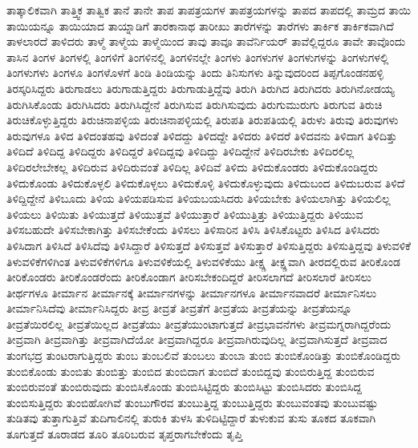 {ತಾತ್ಕಾಲಿಕವಾಗಿ
ತಾತ್ತ್ವಿಕ
ತಾತ್ವಿಕ
ತಾನೆ
ತಾನೇ
ತಾಪ
ತಾಪತ್ರಯಗಳ
ತಾಪತ್ರಯಗಳನ್ನು
ತಾಪದ
ತಾಪದಲ್ಲಿ
ತಾಮ್ರದ
ತಾಯಿ
ತಾಯಿಯನ್ನೂ
ತಾಯಿಯಾದ
ತಾಯ್ನಾಡಿಗೆ
ತಾರಕಾನಾಥ
ತಾರೀಖು
ತಾರೆಗಳನ್ನು
ತಾರೆಗಳು
ತಾರ್ಕಿಕ
ತಾರ್ಕಿಕವಾಗಿದೆ
ತಾಳಲಾರದೆ
ತಾಳಿದರು
ತಾಳ್ಮೆ
ತಾಳ್ಮೆಯ
ತಾಳ್ಮೆಯಿಂದ
ತಾವು
ತಾವೂ
ತಾವೆರ್ನಿಯರ್
ತಾವೆಲ್ಲಿದ್ದರೂ
ತಾವೇ
ತಾವೊಂದು
ತಾಸಿನ
ತಿಂಗಳ
ತಿಂಗಳಲ್ಲಿ
ತಿಂಗಳಿಗೆ
ತಿಂಗಳಿನಲ್ಲಿ
ತಿಂಗಳಿನಲ್ಲೇ
ತಿಂಗಳು
ತಿಂಗಳುಗಳ
ತಿಂಗಳುಗಳನ್ನು
ತಿಂಗಳುಗಳಲ್ಲಿ
ತಿಂಗಳುಗಳು
ತಿಂಗಳೂ
ತಿಂಗಳೊಳಗೆ
ತಿಂಡಿ
ತಿಂಡಿಯನ್ನು
ತಿಂದು
ತಿನಿಸುಗಳು
ತಿನ್ನುವುದರಿಂದ
ತಿಪ್ಪಗೊಂಡನಹಳ್ಳಿ
ತಿರಸ್ಕರಿಸಿದ್ದರು
ತಿರುಗಾಡಲು
ತಿರುಗಾಡುತ್ತಿದ್ದರು
ತಿರುಗಾಡುತ್ತಿದ್ದೆವು
ತಿರುಗಿ
ತಿರುಗಿದ
ತಿರುಗಿದರು
ತಿರುಗಿನೋಡಯ್ಯ
ತಿರುಗಿಸಿಕೊಂಡು
ತಿರುಗಿಸಿದರು
ತಿರುಗಿಸಿದ್ದೇನೆ
ತಿರುಗಿಸುವ
ತಿರುಗಿಸುವುದು
ತಿರುಗುಮುರುಗು
ತಿರುಗುವ
ತಿರುಚಿ
ತಿರುಚಿಕೊಳ್ಳುತ್ತಿದ್ದರು
ತಿರುಚಿನಾಪಳ್ಳಿಯ
ತಿರುಚಿನಾಪಳ್ಳಿಯಲ್ಲಿ
ತಿರುಪತಿ
ತಿರುಪತಿಯಲ್ಲಿ
ತಿರುಳು
ತಿರುವು
ತಿರುವುಗಳು
ತಿರುವುಗಳೂ
ತಿಳಿದ
ತಿಳಿದಂತಹವು
ತಿಳಿದಂತೆ
ತಿಳಿದದ್ದು
ತಿಳಿದದ್ದೇ
ತಿಳಿದರು
ತಿಳಿದರೆ
ತಿಳಿದವನು
ತಿಳಿದಾಗ
ತಿಳಿದಿತ್ತು
ತಿಳಿದಿದೆ
ತಿಳಿದಿದ್ದ
ತಿಳಿದಿದ್ದರು
ತಿಳಿದಿದ್ದರೆ
ತಿಳಿದಿದ್ದವು
ತಿಳಿದಿದ್ದು
ತಿಳಿದಿದ್ದೇನೆ
ತಿಳಿದಿರಬೇಕು
ತಿಳಿದಿರಲಿಲ್ಲ
ತಿಳಿದಿರಲೇಬೇಕಲ್ಲ
ತಿಳಿದಿರುವ
ತಿಳಿದಿರುವಂತೆ
ತಿಳಿದಿಲ್ಲ
ತಿಳಿದಿವೆ
ತಿಳಿದು
ತಿಳಿದುಕೊಂಡರು
ತಿಳಿದುಕೊಂಡಿದ್ದರು
ತಿಳಿದುಕೊಂಡು
ತಿಳಿದುಕೊಳ್ಳಲಿ
ತಿಳಿದುಕೊಳ್ಳಲು
ತಿಳಿದುಕೊಳ್ಳಿ
ತಿಳಿದುಕೊಳ್ಳುವುದು
ತಿಳಿದುಬಂದ
ತಿಳಿದುಬರುವ
ತಿಳಿದೆ
ತಿಳಿದ್ದಿದ್ದೇನೆ
ತಿಳಿಬೂದು
ತಿಳಿಯ
ತಿಳಿಯಪಡಿಸುವ
ತಿಳಿಯಬಯಸಿದರು
ತಿಳಿಯಬೇಕು
ತಿಳಿಯಲಾಗಿತ್ತು
ತಿಳಿಯಲಿಲ್ಲ
ತಿಳಿಯಲು
ತಿಳಿಯಿತು
ತಿಳಿಯುತ್ತದೆ
ತಿಳಿಯುತ್ತವೆ
ತಿಳಿಯುತ್ತಾರೆ
ತಿಳಿಯುತ್ತಿತ್ತು
ತಿಳಿಯುತ್ತಿದ್ದರು
ತಿಳಿಯುವ
ತಿಳಿಸಬಹುದೇ
ತಿಳಿಸಬೇಕಾಗಿತ್ತು
ತಿಳಿಸಬೇಕೆಂದು
ತಿಳಿಸಲು
ತಿಳಿಸಾರಿನ
ತಿಳಿಸಿ
ತಿಳಿಸಿಕೊಟ್ಟರು
ತಿಳಿಸಿದ
ತಿಳಿಸಿದರು
ತಿಳಿಸಿದಾಗ
ತಿಳಿಸಿದೆ
ತಿಳಿಸಿದೆವು
ತಿಳಿಸಿದ್ದಾರೆ
ತಿಳಿಸುತ್ತದೆ
ತಿಳಿಸುತ್ತವೆ
ತಿಳಿಸುತ್ತಾರೆ
ತಿಳಿಸುತ್ತಿದ್ದರು
ತಿಳಿಸುತ್ತಿದ್ದವು
ತಿಳುವಳಿಕೆ
ತಿಳುವಳಿಕೆಗಳಿಗಿಂತ
ತಿಳುವಳಿಕೆಗಳಿಗೂ
ತಿಳುವಳಿಕೆಯಲ್ಲಿ
ತಿಳುವಳಿಕೆಯು
ತೀಕ್ಷ್ಣ
ತೀಕ್ಷ್ಣವಾಗಿ
ತೀರದಲ್ಲಿರುವ
ತೀರಿಕೊಂಡ
ತೀರಿಕೊಂಡರು
ತೀರಿಕೊಂಡರೆಂದು
ತೀರಿಕೊಂಡಾಗ
ತೀರಿಸಬೇಕಂದಿದ್ದರೆ
ತೀರಿಸಲಾಗದೆ
ತೀರಿಸಲಾರೆ
ತೀರಿಸಲು
ತೀರ್ಥಗಳೂ
ತೀರ್ಮಾನ
ತೀರ್ಮಾನಕ್ಕೆ
ತೀರ್ಮಾನಗಳನ್ನು
ತೀರ್ಮಾನಗಳೂ
ತೀರ್ಮಾನವಾದರೆ
ತೀರ್ಮಾನಿಸಲು
ತೀರ್ಮಾನಿಸಿದೆವು
ತೀರ್ಮಾನಿಸಿದ್ದರು
ತೀವ್ರ
ತೀವ್ರತೆ
ತೀವ್ರತೆಗೆ
ತೀವ್ರತೆಯ
ತೀವ್ರತೆಯನ್ನು
ತೀವ್ರತೆಯನ್ನೂ
ತೀವ್ರತೆಯಿರಲಿಲ್ಲ
ತೀವ್ರತೆಯಿಲ್ಲದ
ತೀವ್ರತೆಯು
ತೀವ್ರತೆಯುಂಟಾಗುತ್ತದೆ
ತೀವ್ರಭಾವನೆಗಳು
ತೀವ್ರಮಗ್ನರಾಗಿದ್ದರೆಂದು
ತೀವ್ರವಾಗಿ
ತೀವ್ರವಾಗಿತ್ತು
ತೀವ್ರವಾಗಿದೆಯೋ
ತೀವ್ರವಾಗಿದ್ದರೂ
ತೀವ್ರವಾಗಿರುವುದಿಲ್ಲ
ತೀವ್ರವಾಗಿಸುತ್ತದೆ
ತೀವ್ರವಾದ
ತುಂಗಭದ್ರ
ತುಂಟರಾಗುತ್ತಿದ್ದರು
ತುಂಬ
ತುಂಬಲಿವೆ
ತುಂಬಲು
ತುಂಬಾ
ತುಂಬಿ
ತುಂಬಿಕೊಂಡಿತ್ತು
ತುಂಬಿಕೊಂಡಿದ್ದರು
ತುಂಬಿಕೊಂಡು
ತುಂಬಿತು
ತುಂಬಿತ್ತು
ತುಂಬಿದ
ತುಂಬಿದಾಗ
ತುಂಬಿದೆ
ತುಂಬಿದ್ದವು
ತುಂಬಿರುತ್ತಿದ್ದ
ತುಂಬಿರುವ
ತುಂಬಿರುವಂತೆ
ತುಂಬಿರುವುದು
ತುಂಬಿಸಿಕೊಂಡು
ತುಂಬಿಸಿಟ್ಟಿದ್ದರು
ತುಂಬಿಸಿಟ್ಟು
ತುಂಬಿಸಿದರು
ತುಂಬಿಸಿದ್ದ
ತುಂಬಿಸುತ್ತಿದ್ದರು
ತುಂಬಿಹೋಗಿವೆ
ತುಂಬುಗೌರವ
ತುಂಬುತ್ತಿದ್ದ
ತುಂಬುತ್ತಿದ್ದರು
ತುಂಬುವಂತವು
ತುಂಬುವಷ್ಟು
ತುಡಿತವು
ತುತ್ತಾಗುತ್ತಿವೆ
ತುದಿಗಾಲಿನಲ್ಲಿ
ತುರುಕಿ
ತುಳಸಿ
ತುಳಿದಿಟ್ಟಿದ್ದಾರೆ
ತುಳುಕುವ
ತುಸು
ತೂಕದ
ತೂಕವಾಗಿ
ತೂಗುತ್ತದೆ
ತೂರಾಡದ
ತೂರಿ
ತೂರಿಬರುವ
ತೃಪ್ತರಾಗಬೇಕೆಂದು
ತೃಪ್ತಿ
}
